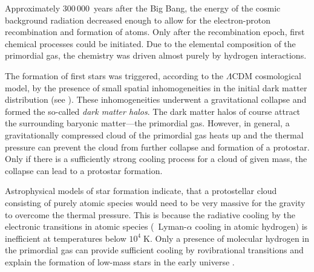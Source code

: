 Approximately $300\,000$~years after the Big Bang, the
energy of the cosmic background radiation decreased enough to allow for the
electron-proton recombination and formation of atoms. Only after the
recombination epoch, first chemical processes could be initiated. Due to the
elemental composition of the primordial gas, the chemistry was driven almost
purely by hydrogen interactions. 

The formation of first stars was triggered, according to the $\Lambda$CDM
cosmological model, by the presence of small spatial inhomogeneities in
the initial dark matter distribution (see \cite{abel2002,glover2011}).
These inhomogeneities underwent a
gravitational collapse and formed the so-called {\em dark matter halos}.
The dark matter halos of course attract the surrounding baryonic matter---the
primordial gas.
However, in general, a gravitationally compressed cloud of the primordial
gas heats up and the thermal pressure can prevent the cloud from further
collapse and formation of a protostar.
Only if there is a sufficiently
strong cooling process for a cloud of given mass,
the collapse can lead to a protostar formation.

Astrophysical models of star formation indicate, that a protostellar
cloud consisting of purely atomic species would need to be very massive
for the gravity to overcome the thermal pressure. This is because the
radiative
cooling by the electronic transitions in atomic species (\ie\ Lyman-$\alpha$
cooling in atomic hydrogen) is inefficient at temperatures below $10^4\;\text{K}$.
Only
a presence of molecular hydrogen in the primordial gas can provide sufficient
cooling by rovibrational transitions and explain
the formation of low-mass stars in the early universe \citep{palla1983}.

